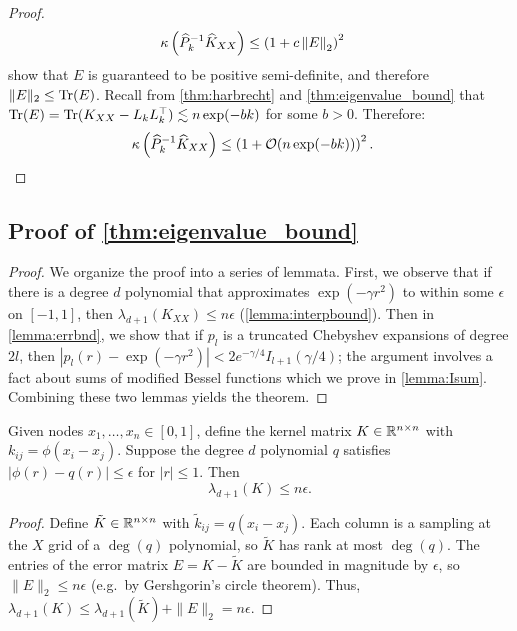\begin{proof}
\begin{align*}
    \kappa \left( \widehat{P}_{k}^{-1}\widehat{K}_{XX} \right)
    &\leq \left( 1 + c \left\Vert E \right\Vert_{2} \right)^2
  \end{align*}
  \citet{harbrecht2012low} show that $E$ is guaranteed to be positive semi-definite, and therefore $\Vert E \Vert_2 \leq \tr{E}$.
  Recall from \autoref{thm:harbrecht} and \autoref{thm:eigenvalue_bound} that $\tr{E} = \tr{K_{XX} - L_k L_k^\top} \lesssim n\exp(-bk)$ for some $b > 0$.
  Therefore:
  \begin{align*}
    \kappa \left( \trainP_{k}^{-1}\trainK \right)
    &\leq \left(1 + \bigo{n\exp(-bk)}\right)^2.
  \end{align*}
\end{proof}

\subsection{Proof of \autoref{thm:eigenvalue_bound}}
\begin{proof}
  We organize the proof into a series of lemmata.  First, we observe
  that if there is a degree $d$ polynomial that approximates
  $\exp(-\gamma r^2)$ to within some $\epsilon$ on $[-1,1]$,
  then $\lambda_{d+1}(K_{XX}) \leq n\epsilon$
  (\autoref{lemma:interpbound}).
  Then in \autoref{lemma:errbnd}, we show that if $p_l$ is a
  truncated Chebyshev expansions of degree $2l$, then
  $|p_l(r)-\exp(-\gamma r^2)| < 2 e^{-\gamma/4} I_{l+1}(\gamma/4)$;
  the argument involves a fact about sums of modified Bessel functions
  which we prove in \autoref{lemma:Isum}.
  Combining these two lemmas yields the theorem.
\end{proof}
%
\begin{lemma}\label{lemma:interpbound}
  Given nodes $x_1, \ldots, x_n \in [0,1]$, define the kernel matrix
  $K \in \mathbb{R}^{n \times n}$ with $k_{ij} = \phi(x_i-x_j)$.  Suppose
  the degree $d$ polynomial $q$ satisfies $|\phi(r)-q(r)| \leq
  \epsilon$ for $|r| \leq 1$.  Then
  \[
    \lambda_{d+1}(K) \leq n \epsilon.
  \]
\end{lemma}
\begin{proof}
  Define $\tilde{K} \in \mathbb{R}^{n \times n}$ with $\tilde{k}_{ij} = q(x_i-x_j)$.
  Each column is a sampling at the $X$ grid of a $\deg(q)$ polynomial, so
  $\tilde{K}$ has rank at most $\deg(q)$.  The entries of the
  error matrix $E = K-\tilde{K}$ are bounded in magnitude by
  $\epsilon$, so $\|E\|_2 \leq n\epsilon$ (e.g.~by Gershgorin's circle theorem).
  Thus, $\lambda_{d+1}(K) \leq \lambda_{d+1}(\tilde{K}) + \|E\|_2 = n\epsilon$.
\end{proof}



